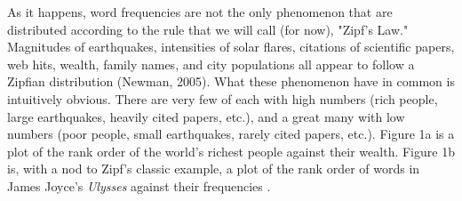 \documentclass[12pt]{article}
\begin{document}
\indent As it happens, word frequencies are not the only phenomenon that are distributed according to the rule that we will call (for now), "Zipf's Law."  Magnitudes of earthquakes, intensities of solar flares, citations of scientific papers, web hits, wealth, family names, and city populations all appear to follow a Zipfian distribution (Newman, 2005).  What these phenomenon have in common is intuitively obvious.  There are very few of each with high numbers (rich people, large earthquakes, heavily cited papers, etc.), and a great many with low numbers (poor people, small earthquakes, rarely cited papers, etc.).   Figure 1a is a plot of the rank order of the world's richest people against their wealth.  Figure 1b is, with a nod to Zipf's classic example, a plot of the rank order of words in James Joyce's \emph{Ulysses} against their frequencies .   
\end{document}
